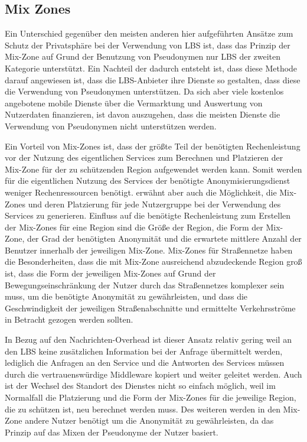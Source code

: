 \subsection{Mix Zones}
Ein Unterschied gegenüber den  meisten anderen hier aufgeführten Ansätze zum Schutz der Privatsphäre bei der Verwendung von LBS ist, dass das Prinzip der Mix-Zone auf Grund der Benutzung von Pseudonymen nur LBS der zweiten Kategorie unterstützt. Ein Nachteil der dadurch entsteht ist, dass diese Methode darauf angewiesen ist, dass die LBS-Anbieter ihre Dienste so gestalten, dass diese die Verwendung von Pseudonymen unterstützen. Da sich aber viele kostenlos angebotene mobile Dienste über die Vermarktung und Auswertung von Nutzerdaten finanzieren, ist davon auszugehen, dass die meisten Dienste die Verwendung von Pseudonymen nicht unterstützen werden.

Ein Vorteil von Mix-Zones ist, dass der größte Teil der benötigten Rechenleistung vor der Nutzung des eigentlichen Services zum Berechnen und Platzieren der Mix-Zone für der zu schützenden Region aufgewendet werden kann. Somit werden für die eigentlichen Nutzung des Services der benötigte Anonymisierungsdienst weniger Rechenressourcen benötigt. \cite{Beresford2003} erwähnt aber auch die Möglichkeit, die Mix-Zones und deren Platzierung für jede Nutzergruppe bei der Verwendung des Services zu generieren. Einfluss auf die benötigte Rechenleistung zum Erstellen der Mix-Zones für eine Region sind die Größe der Region, die Form der Mix-Zone, der Grad der benötigten Anonymität und die erwartete mittlere Anzahl der Benutzer innerhalb der jeweiligen Mix-Zone. Mix-Zones für Straßennetze haben die Besonderheiten, dass die mit Mix-Zone ausreichend abzudeckende Region groß ist, dass die Form der jeweiligen Mix-Zones auf Grund der Bewegungseinschränkung der Nutzer durch das Straßennetzes komplexer sein muss, um die benötigte Anonymität zu gewährleisten, und dass die Geschwindigkeit der jeweiligen Straßenabschnitte und ermittelte Verkehrsströme in Betracht gezogen werden sollten. 

In Bezug auf den Nachrichten-Overhead ist dieser Ansatz relativ gering weil an den LBS keine zusätzlichen Information bei der Anfrage übermittelt werden, lediglich die Anfragen an den Service und die Antworten des Services müssen durch die vertrauenswürdige Middleware kopiert und weiter geleitet werden. Auch ist der Wechsel des Standort des Dienstes nicht so einfach möglich, weil im Normalfall die Platzierung und die Form der Mix-Zones für die jeweilige Region, die zu schützen ist, neu berechnet werden muss. Des weiteren werden in den Mix-Zone andere Nutzer benötigt um die Anonymität zu gewährleisten, da das Prinzip auf das Mixen der Pseudonyme der Nutzer basiert. 

